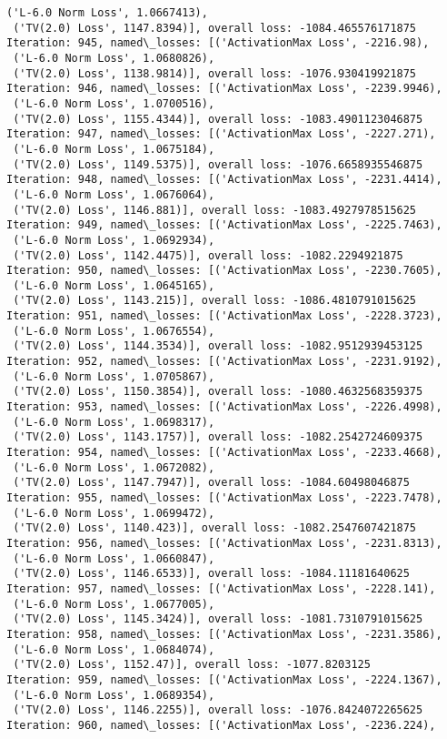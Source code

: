 \documentclass[10pt]{article}
\begin{document}
\begin{Verbatim}[commandchars=\\\{\}]
 ('L-6.0 Norm Loss', 1.0667413),
 ('TV(2.0) Loss', 1147.8394)], overall loss: -1084.465576171875
Iteration: 945, named\_losses: [('ActivationMax Loss', -2216.98),
 ('L-6.0 Norm Loss', 1.0680826),
 ('TV(2.0) Loss', 1138.9814)], overall loss: -1076.930419921875
Iteration: 946, named\_losses: [('ActivationMax Loss', -2239.9946),
 ('L-6.0 Norm Loss', 1.0700516),
 ('TV(2.0) Loss', 1155.4344)], overall loss: -1083.4901123046875
Iteration: 947, named\_losses: [('ActivationMax Loss', -2227.271),
 ('L-6.0 Norm Loss', 1.0675184),
 ('TV(2.0) Loss', 1149.5375)], overall loss: -1076.6658935546875
Iteration: 948, named\_losses: [('ActivationMax Loss', -2231.4414),
 ('L-6.0 Norm Loss', 1.0676064),
 ('TV(2.0) Loss', 1146.881)], overall loss: -1083.4927978515625
Iteration: 949, named\_losses: [('ActivationMax Loss', -2225.7463),
 ('L-6.0 Norm Loss', 1.0692934),
 ('TV(2.0) Loss', 1142.4475)], overall loss: -1082.2294921875
Iteration: 950, named\_losses: [('ActivationMax Loss', -2230.7605),
 ('L-6.0 Norm Loss', 1.0645165),
 ('TV(2.0) Loss', 1143.215)], overall loss: -1086.4810791015625
Iteration: 951, named\_losses: [('ActivationMax Loss', -2228.3723),
 ('L-6.0 Norm Loss', 1.0676554),
 ('TV(2.0) Loss', 1144.3534)], overall loss: -1082.9512939453125
Iteration: 952, named\_losses: [('ActivationMax Loss', -2231.9192),
 ('L-6.0 Norm Loss', 1.0705867),
 ('TV(2.0) Loss', 1150.3854)], overall loss: -1080.4632568359375
Iteration: 953, named\_losses: [('ActivationMax Loss', -2226.4998),
 ('L-6.0 Norm Loss', 1.0698317),
 ('TV(2.0) Loss', 1143.1757)], overall loss: -1082.2542724609375
Iteration: 954, named\_losses: [('ActivationMax Loss', -2233.4668),
 ('L-6.0 Norm Loss', 1.0672082),
 ('TV(2.0) Loss', 1147.7947)], overall loss: -1084.60498046875
Iteration: 955, named\_losses: [('ActivationMax Loss', -2223.7478),
 ('L-6.0 Norm Loss', 1.0699472),
 ('TV(2.0) Loss', 1140.423)], overall loss: -1082.2547607421875
Iteration: 956, named\_losses: [('ActivationMax Loss', -2231.8313),
 ('L-6.0 Norm Loss', 1.0660847),
 ('TV(2.0) Loss', 1146.6533)], overall loss: -1084.11181640625
Iteration: 957, named\_losses: [('ActivationMax Loss', -2228.141),
 ('L-6.0 Norm Loss', 1.0677005),
 ('TV(2.0) Loss', 1145.3424)], overall loss: -1081.7310791015625
Iteration: 958, named\_losses: [('ActivationMax Loss', -2231.3586),
 ('L-6.0 Norm Loss', 1.0684074),
 ('TV(2.0) Loss', 1152.47)], overall loss: -1077.8203125
Iteration: 959, named\_losses: [('ActivationMax Loss', -2224.1367),
 ('L-6.0 Norm Loss', 1.0689354),
 ('TV(2.0) Loss', 1146.2255)], overall loss: -1076.8424072265625
Iteration: 960, named\_losses: [('ActivationMax Loss', -2236.224),

\end{Verbatim}
\end{document}
